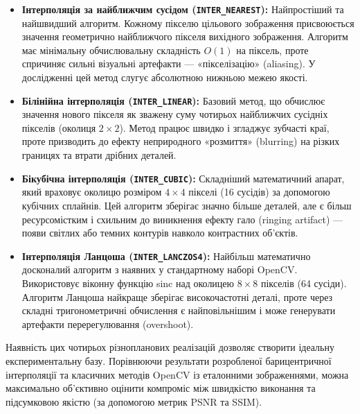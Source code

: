 \begin{itemize}
	\item \textbf{Інтерполяція за найближчим сусідом (\texttt{INTER\_NEAREST}):} Найпростіший та найшвидший алгоритм. Кожному пікселю цільового зображення присвоюється значення геометрично найближчого пікселя вихідного зображення. Алгоритм має мінімальну обчислювальну складність $O(1)$ на піксель, проте спричиняє сильні візуальні артефакти — «пікселізацію» (aliasing). У дослідженні цей метод слугує абсолютною нижньою межею якості.
	
	\item \textbf{Білінійна інтерполяція (\texttt{INTER\_LINEAR}):} Базовий метод, що обчислює значення нового пікселя як зважену суму чотирьох найближчих сусідніх пікселів (околиця $2 \times 2$). Метод працює швидко і згладжує зубчасті краї, проте призводить до ефекту неприродного «розмиття» (blurring) на різких границях та втрати дрібних деталей.
	
	\item \textbf{Бікубічна інтерполяція (\texttt{INTER\_CUBIC}):} Складніший математичний апарат, який враховує околицю розміром $4 \times 4$ пікселі (16 сусідів) за допомогою кубічних сплайнів. Цей алгоритм зберігає значно більше деталей, але є більш ресурсомістким і схильним до виникнення ефекту гало (ringing artifact) — появи світлих або темних контурів навколо контрастних об'єктів.
	
	\item \textbf{Інтерполяція Ланцоша (\texttt{INTER\_LANCZOS4}):} Найбільш математично досконалий алгоритм з наявних у стандартному наборі OpenCV. Використовує віконну функцію sinc над околицею $8 \times 8$ пікселів (64 сусіди). Алгоритм Ланцоша найкраще зберігає високочастотні деталі, проте через складні тригонометричні обчислення є найповільнішим і може генерувати артефакти перерегулювання (overshoot).
\end{itemize}

Наявність цих чотирьох різнопланових реалізацій дозволяє створити ідеальну експериментальну базу. Порівнюючи результати розробленої барицентричної інтерполяції та класичних методів OpenCV із еталонними зображеннями, можна максимально об'єктивно оцінити компроміс між швидкістю виконання та підсумковою якістю (за допомогою метрик PSNR та SSIM).